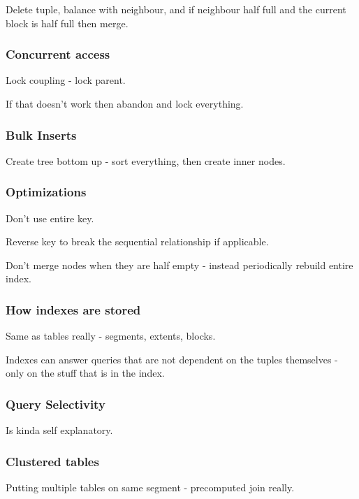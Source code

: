 \documentclass{article}
\begin{document}
				Delete tuple, balance with neighbour, and if neighbour half full and the current block is half full then merge.
				
			\subsubsection{Concurrent access}
			
				Lock coupling - lock parent.
				
				If that doesn't work then abandon and lock everything.
				
			\subsubsection{Bulk Inserts}
			
				Create tree bottom up - sort everything, then create inner nodes.
				
			\subsubsection{Optimizations}
			
				Don't use entire key.
				
				Reverse key to break the sequential relationship if applicable.
				
				Don't merge nodes when they are half empty - instead periodically rebuild entire index.
				
			\subsubsection{How indexes are stored}
 				
				Same as tables really - segments, extents, blocks.
				
				Indexes can answer queries that are not dependent on the tuples themselves - only on the stuff that is in the index.
				
			\subsubsection{Query Selectivity}
			
				Is kinda self explanatory.
				
			\subsubsection{Clustered tables}
			
				Putting multiple tables on same segment - precomputed join really.
				
\end{document}
